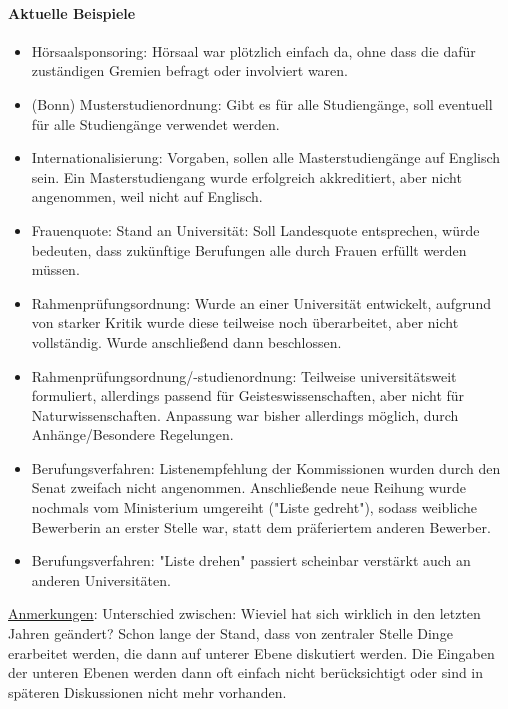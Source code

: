     \paragraph{Aktuelle Beispiele}
      \begin{itemize}
        \item Hörsaalsponsoring: Hörsaal war plötzlich einfach da, ohne dass die dafür zuständigen Gremien befragt oder involviert waren.
        \item (Bonn) Musterstudienordnung: Gibt es für alle Studiengänge, soll eventuell für alle Studiengänge verwendet werden.
        \item Internationalisierung: Vorgaben, sollen alle Masterstudiengänge auf Englisch sein. Ein Masterstudiengang wurde erfolgreich akkreditiert, aber nicht angenommen, weil nicht auf Englisch.
        \item Frauenquote: Stand an Universität: Soll Landesquote entsprechen, würde bedeuten, dass zukünftige Berufungen alle durch Frauen erfüllt werden müssen.
        \item Rahmenprüfungsordnung: Wurde an einer Universität entwickelt, aufgrund von starker Kritik wurde diese teilweise noch überarbeitet, aber nicht vollständig. Wurde anschließend dann beschlossen.
        \item Rahmenprüfungsordnung/-studienordnung: Teilweise universitätsweit formuliert, allerdings passend für Geisteswissenschaften, aber nicht für Naturwissenschaften. Anpassung war bisher allerdings möglich, durch Anhänge/Besondere Regelungen.
        \item Berufungsverfahren: Listenempfehlung der Kommissionen wurden durch den Senat zweifach nicht angenommen. Anschließende neue Reihung wurde nochmals vom Ministerium umgereiht ("Liste gedreht"), sodass weibliche Bewerberin an erster Stelle war, statt dem präferiertem anderen Bewerber.
        \item Berufungsverfahren: "Liste drehen" passiert scheinbar verstärkt auch an anderen Universitäten.
      \end{itemize}
    \underline{Anmerkungen}: Unterschied zwischen: Wieviel hat sich wirklich in den letzten Jahren geändert? Schon lange der Stand, dass von zentraler Stelle Dinge erarbeitet werden, die dann auf unterer Ebene diskutiert werden. Die Eingaben der unteren Ebenen werden dann oft einfach nicht berücksichtigt oder sind in späteren Diskussionen nicht mehr vorhanden. \\

